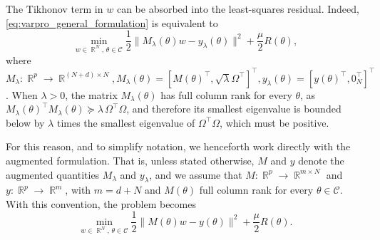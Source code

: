 \documentclass{article}
\DeclareMathOperator{\R}{\mathbb{R}}
\begin{document}
The Tikhonov term in $w$ can be absorbed into the least-squares residual. Indeed,
\eqref{eq:varpro_general_formulation} is equivalent to
\begin{equation}\label{eq:augmented_varpro_formulation}
    \min_{w \in \R^{N},\,\theta \in \mathcal C}
    \frac12 \|M_\lambda(\theta)w-y_\lambda(\theta)\|^2
    + \frac{\mu}{2}R(\theta),
\end{equation}
where $ M_\lambda : \R^p \to \R^{(N+d) \times N}, M_\lambda(\theta) = [M(\theta)^\top,\sqrt\lambda \Omega^\top]^\top,  y_\lambda(\theta) = [y(\theta)^\top,0_N^\top]^\top$. 
When $\lambda>0$, the matrix $M_\lambda(\theta)$ has full column rank for every
$\theta$, as $M_\lambda(\theta)^\top M_\lambda(\theta)
    \succeq
    \lambda\,\Omega^\top\Omega$, 
and therefore its smallest eigenvalue is bounded below by
$\lambda$ times the smallest eigenvalue of $\Omega^\top\Omega$, which must be positive. 

For this reason, and to simplify notation, we henceforth work directly with the augmented formulation. That is, unless stated otherwise, $M$ and $y$ denote the
augmented quantities $M_\lambda$ and $y_\lambda$, and we assume that $M:\R^p \to \R^{m\times N}$ and $y:\R^p \to \R^m$, with $m=d+N$ and $M(\theta)$ full column rank for every $\theta\in\mathcal C$. With this convention, the problem becomes
\begin{equation}\label{eq:varpro_augmented_convention}
    \min_{w \in \R^N,\,\theta\in\mathcal C}
    \frac12\|M(\theta)w-y(\theta)\|^2
    + \frac{\mu}{2}R(\theta).
\end{equation}
\end{document}
